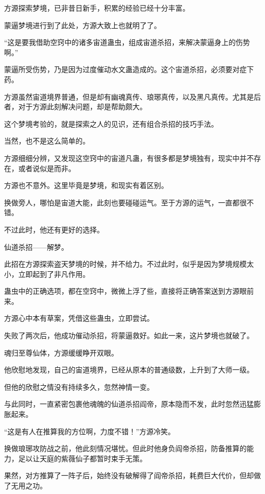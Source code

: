 
\begin{this_body}

方源探索梦境，已非昔日新手，积累的经验已经十分丰富。

蒙逼梦境进行到了此处，方源大致上也就明了了。

“这是要我借助空窍中的诸多宙道蛊虫，组成宙道杀招，来解决蒙逼身上的伤势啊。”

蒙逼所受伤势，乃是因为过度催动水文蛊造成的。这个宙道杀招，必须要对症下药。

方源虽然宙道境界普通，但是却有幽魂真传、琅琊真传，以及黑凡真传。尤其是后者，对于方源此刻解决问题，却是帮助颇大。

这个梦境考验的，就是探索之人的见识，还有组合杀招的技巧手法。

当然，也不是这么简单的。

方源细细分辨，又发现这空窍中的宙道凡蛊，有很多都是梦境独有，现实中并不存在，或者说似是而非。

方源也不意外。这里毕竟是梦境，和现实有着区别。

换做旁人，哪怕是宙道大能，此刻也要碰碰运气。至于方源的运气，一直都很不错。

不过此时，他还有更好的选择。

仙道杀招——解梦。

此招在方源探索盗天梦境的时候，并不给力。不过此时，似乎是因为梦境规模太小，立即起到了非凡作用。

蛊虫中的正确选项，都在空窍中，微微上浮了些，直接将正确答案送到方源眼前来。

方源心中本有草案，凭借这些蛊虫，立即尝试。

失败了两次后，他成功催动杀招，将蒙逼救好。如此一来，这片梦境也就破了。

魂归至尊仙体，方源缓缓睁开双眼。

他欣慰地发现，自己的宙道境界，已经从原本的普通级数，上升到了大师一级。

但他的欣慰之情没有持续多久，忽然神情一变。

与此同时，一直紧密包裹他魂魄的仙道杀招阎帝，原本隐而不发，此时忽然迅猛膨胀起来。

“这是有人在推算我的方位啊，力度不错！”方源冷笑。

换做琅琊攻防战之前，他此刻情况堪忧。但此时他身负阎帝杀招，防备推算的能力，足以让天庭的紫薇仙子都暂时束手无策。

果然，对方推算了一阵子后，始终没有破解得了阎帝杀招，耗费巨大代价，但却做了无用之功。


\end{this_body}

